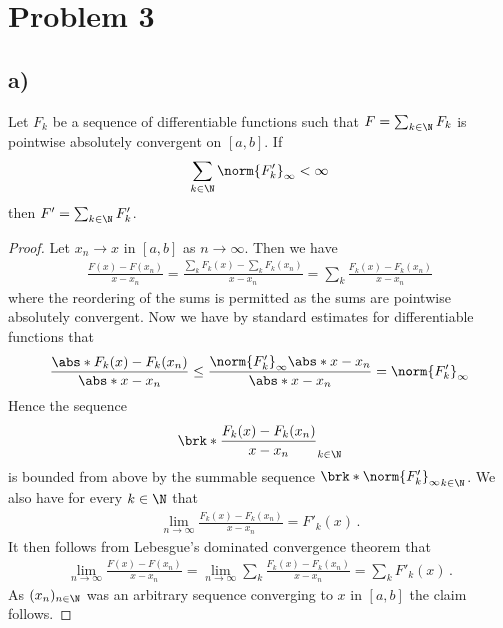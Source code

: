 \section{Problem 3}
\subsection{a)}

\begin{claim}
Let $F_k$ be a sequence of differentiable functions such that $F=\sum_{k\in\N}F_k$ is pointwise absolutely convergent on $[a,b]$. If
\begin{align*}
	\sum_{k\in\N}\norm{F'_k}_\infty<\infty
\end{align*}
then $F'=\sum_{k\in\N}F'_k$.
\end{claim}
\begin{proof}
Let $x_n\to x$ in $[a,b]$ as $n\to\infty$. Then we have
\begin{align*}
	\frac{F(x)-F(x_n)}{x-x_n}
	= \frac{\sum_kF_k(x)-\sum_kF_k(x_n)}{x-x_n}
	= \sum_k\frac{F_k(x)-F_k(x_n)}{x-x_n}
\end{align*}
where the reordering of the sums is permitted as the sums are pointwise absolutely convergent. Now we have by standard estimates  for differentiable functions that
\begin{align*}
	\frac{\abs*{F_k(x)-F_k(x_n)}}{\abs*{x-x_n}}
	\leq \frac{\norm{F'_k}_\infty\abs*{x-x_n}}{\abs*{x-x_n}}
	= \norm{F'_k}_\infty
\end{align*}
Hence the sequence
\begin{align*}
	\brk*{\frac{F_k(x)-F_k(x_n)}{x-x_n}}_{k\in\N}
\end{align*}
is bounded from above by the summable sequence $\brk*{\norm{F'_k}_\infty}_{k\in\N}$.
We also have for every $k\in\N$ that
\begin{align*}
	\lim_{n\to\infty}\frac{F_k(x)-F_k(x_n)}{x-x_n}=F'_k(x)\,.
\end{align*}
It then follows from Lebesgue's dominated convergence theorem that
\begin{align*}
	\lim_{n\to\infty}\frac{F(x)-F(x_n)}{x-x_n}
	= \lim_{n\to\infty}\sum_k\frac{F_k(x)-F_k(x_n)}{x-x_n}
	= \sum_kF'_k(x)\,.
\end{align*}
As $(x_n)_{n\in\N}$ was an arbitrary sequence converging to $x$ in $[a,b]$ the claim follows.
\end{proof}

